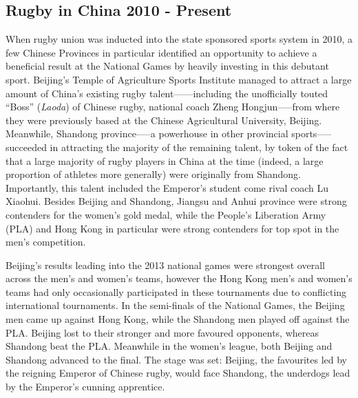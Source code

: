 {\subsection{Rugby in China 2010 - Present}
When rugby union was inducted into the state sponsored sports system in 2010, a few Chinese Provinces in particular identified an opportunity to achieve a beneficial result at the National Games by heavily investing in this debutant sport.  Beijing's Temple of Agriculture Sports Institute managed to attract a large amount of China's existing rugby talent—---including the unofficially touted ``Boss''  (\textit{Laoda}) of Chinese rugby, national coach Zheng Hongjun—--from where they were previously based at the Chinese Agricultural University, Beijing.  Meanwhile, Shandong province—--a powerhouse in other provincial sports--—succeeded in attracting the majority of the remaining talent, by token of the fact that a large majority of rugby players in China at the time (indeed, a large proportion of athletes more generally) were originally from Shandong.  Importantly, this talent included the Emperor's student come rival coach Lu Xiaohui.  Besides Beijing and Shandong, Jiangsu and Anhui province were strong contenders for the women's gold medal, while the People's Liberation Army (PLA) and Hong Kong in particular were strong contenders for top spot in the men's competition.

Beijing's results leading into the 2013 national games were strongest overall across the men's and women's teams, however the Hong Kong men's and women's teams had only occasionally participated in these tournaments due to conflicting international tournaments.  In the semi-finals of the National Games, the Beijing men came up against Hong Kong, while the Shandong men played off against the PLA.  Beijing lost to their stronger and more favoured opponents, whereas Shandong beat the PLA.  Meanwhile in the women's league, both Beijing and Shandong advanced to the final.  The stage was set: Beijing, the favourites led by the reigning Emperor of Chinese rugby, would face Shandong, the underdogs lead by the Emperor's cunning apprentice.

}
